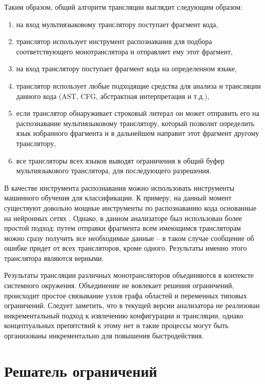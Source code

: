 Таким образом, общий алгоритм трансляции выглядит следующим образом:
\begin{enumerate}[1)]
    \item на вход мультиязыковому транслятору поступает фрагмент кода,
    \item транслятор использует инструмент распознавания для подбора соответствующего монотранслятора и отправляет ему этот фрагмент,
    \item на вход транслятору поступает фрагмент кода на определенном языке,
    \item транслятор использует любые подходящие средства для анализа и трансляции данного кода
    (AST, CFG, абстрактная интерпретация и т.д.),
    \item если транслятор обнаруживает строковый литерал он может отправить его на распознавание мультиязыковому транслятору, который
    позволит определить язык избранного фрагмента и в дальнейшем направит этот фрагмент другому транслятору,
    \item все трансляторы всех языков выводят ограничения в общий буфер мультиязыкового транслятора, для последующего разрешения.
\end{enumerate}

В качестве инструмента распознавания можно использовать инструменты машинного обучения для классификации. К примеру,
на данный момент существуют довольно мощные инструменты по распознаванию кода основанные на нейронных сетях \cite{guesslang}.
Однако, в данном анализаторе был использован более простой подход: путем отправки фрагмента всем имеющимся
трансляторам можно сразу получить все необходимые данные -- в таком случае сообщение об ошибке придет от всех трансляторов, кроме одного.
Результаты именно этого транслятора являются верными.

Результаты трансляции различных монотрансляторов объединяются в контексте системного окружения. Объединение не
вовлекает решения ограничений, происходит простое связывание узлов графа областей и переменных типовых ограничений.
Следует заметить, что в текущей версии
анализатора не реализован инкрементальный подход к извлечению конфигурации и трансляции, однако концептуальных
препятствий к этому нет и такие процессы могут быть организованы инкрементально для повышения быстродействия.

\section{Решатель ограничений} \label{sec:solver}

